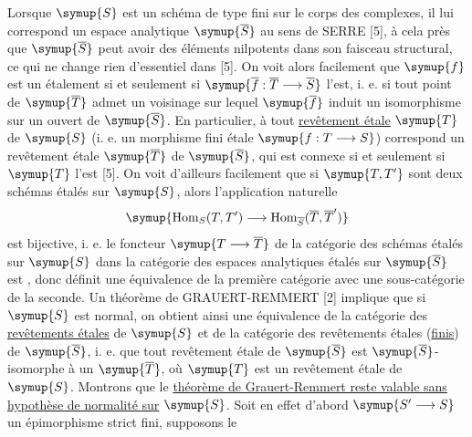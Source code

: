 Lorsque $\symup{S}$ est un schéma de type fini sur le corps des complexes, il lui
correspond un espace analytique $\symup{\overline S}$ au sens de SERRE [5], à cela près
que $\symup{\overline S}$ peut avoir des éléments nilpotents dans son faisceau
structural, ce qui ne change rien d'essentiel dans [5]. On voit alors facilement
que $\symup{f}$ est un étalement si et seulement si
$\symup{\overline f:\overline T\longrightarrow\overline S}$ l'est, i. e. si tout point
de $\symup{\overline T}$ admet un voisinage sur lequel $\symup{\overline f}$ induit un
isomorphisme sur un ouvert de $\symup{\overline S}$. En particulier, à tout
\uline{revêtement étale} $\symup{T}$ de $\symup{S}$ (i. e. un morphisme fini étale
$\symup{f:T\longrightarrow S}$) correspond un revêtement étale $\symup{\overline T}$ de
$\symup{\overline S}$, qui est connexe si et seulement si $\symup{T}$ l'est [5]. On voit
d'ailleurs facilement que si $\symup{T,T'}$ sont deux schémas étalés sur $\symup{S}$, alors
l'application naturelle
\[
  \symup{\operatorname{Hom}_S(T,T')\longrightarrow
  \operatorname{Hom}_{\overline S}(\overline T,\overline T')}
\]
est bijective, i. e. le foncteur $\symup{T\longrightarrow\overline T}$ de la catégorie des
schémas étalés sur $\symup{S}$ dans la catégorie des espaces analytiques étalés sur
$\symup{\overline S}$ est , donc définit une équivalence de la
première catégorie avec une sous-catégorie de la seconde. Un théorème de
GRAUERT-REMMERT [2] implique que si $\symup{S}$ est normal, on obtient ainsi une
équivalence de la catégorie des \uline{revêtements étales} de $\symup{S}$ et de la
catégorie des revêtements étales (\uline{finis}) de $\symup{\overline S}$, i. e. que tout
revêtement étale de $\symup{\overline S}$ est $\symup{\overline S}$-isomorphe à un
$\symup{\overline T}$, où $\symup{T}$ est un revêtement étale de $\symup{S}$. Montrons que le
\uline{théorème de Grauert-Remmert reste valable sans hypothèse de normalité sur}
$\symup{S}$. Soit en effet d'abord $\symup{S'\longrightarrow S}$ un épimorphisme strict fini,
supposons le

